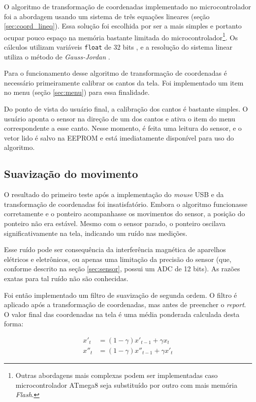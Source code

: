 \documentclass[brazil,pagestart=firstchapter]{abnt}
\begin{document}
O algoritmo de transformação de coordenadas implementado no microcontrolador
foi a abordagem usando um sistema de três equações lineares (seção
\ref{sec:coord_lineq}). Essa solução foi escolhida por ser a mais simples e
portanto ocupar pouco espaço na memória bastante limitada do
microcontrolador\footnote{
	Outras abordagens mais complexas podem ser implementadas caso
	microcontrolador ATmega8 seja substituído por outro com mais memória
	\textit{Flash}.
}. Os cálculos utilizam variáveis \texttt{float} de 32 bits
\cite{avrlibcfaq}, e a resolução do sistema linear utiliza o método de
\textit{Gauss-Jordan} \cite{GaussJordanInPython}.

Para o funcionamento desse algoritmo de transformação de coordenadas é
necessário primeiramente calibrar os cantos da tela. Foi implementado um
item no menu (seção \ref{sec:menu}) para essa finalidade.

Do ponto de vista do usuário final, a calibração dos cantos é bastante
simples. O usuário aponta o sensor na direção de um dos cantos e ativa o
item do menu correspondente a esse canto. Nesse momento, é feita uma leitura
do sensor, e o vetor lido é salvo na \ac{EEPROM} e está imediatamente
disponível para uso do algoritmo.

\subsection{Suavização do movimento}
\label{sub:mouse_smoothing}

O resultado do primeiro teste após a implementação do \textit{mouse}
\ac{USB} e da transformação de coordenadas foi insatisfatório. Embora o
algoritmo funcionasse corretamente e o ponteiro acompanhasse os movimentos
do sensor, a posição do ponteiro não era estável. Mesmo com o sensor parado,
o ponteiro oscilava significativamente na tela, indicando um ruído nas
medições.

Esse ruído pode ser consequência da interferência magnética de aparelhos
elétricos e eletrônicos, ou apenas uma limitação da precisão do sensor (que,
conforme descrito na seção \ref{sec:sensor}, possui um \ac{ADC} de 12 bits).
As razões exatas para tal ruído não são conhecidas.

Foi então implementado um filtro de suavização de segunda ordem. O filtro é
aplicado após a transformação de coordenadas, mas antes de preencher o
\textit{report}. O valor final das coordenadas na tela é uma média ponderada
calculada desta forma:

\begin{align*}
x' _t & = (1-\gamma) x' _{t-1} + \gamma x _t  \\
x''_t & = (1-\gamma) x''_{t-1} + \gamma x'_t
\end{align*}
\end{document}
